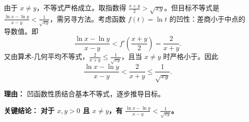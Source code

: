 \begin{examplebox}
\begin{description}[style=nextline, leftmargin=2.8em, labelsep=0.5em, itemsep=0.45em]
    \item[\textbf{第三步（推导目标）：}] 由于 $x \neq y$，不等式严格成立。取指数得 $\frac{x+y}{2} > \sqrt{xy}$。但目标不等式是 $\frac{\ln x - \ln y}{x - y} < \frac{1}{\sqrt{xy}}$，需另寻方法。考虑函数 $f(t)=\ln t$ 的凹性：差商小于中点的导数值。即
    \[
    \frac{\ln x - \ln y}{x - y} < f'\!\left( \frac{x+y}{2} \right) = \frac{2}{x+y}.
    \]
    又由算术-几何平均不等式，$\frac{2}{x+y} \leq \frac{1}{\sqrt{xy}}$，且当 $x \neq y$ 时严格小于。因此
    \[
    \frac{\ln x - \ln y}{x - y} < \frac{2}{x+y} \leq \frac{1}{\sqrt{xy}}.
    \]
    \par\textbf{理由：}
    凹函数性质结合基本不等式，逐步推导目标。
\end{description}

\textbf{\textcolor{CExample}{关键结论：}} \textbf{对于 $x, y > 0$ 且 $x \neq y$，有 $\frac{\ln x - \ln y}{x - y} < \frac{1}{\sqrt{xy}}$。}
\end{examplebox}
